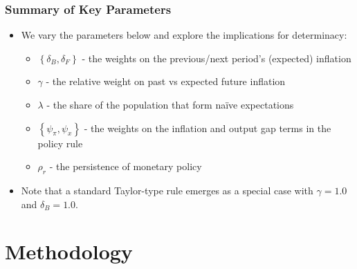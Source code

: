 \documentclass{beamer}
\begin{document}
\begin{frame}
	\frametitle{Summary of Key Parameters}
	\begin{itemize}
		\item We vary the parameters below and explore the implications for determinacy: 
		\begin{itemize}
			\item  $\left\{\delta_B, \delta_F \right\}$ - the weights on the previous/next period's (expected) inflation
			\item $\gamma$ - the relative weight on past vs expected future inflation
			\item $\lambda$ - the share of the population that form na\"ive expectations
			\item  $\left\{\psi_\pi, \psi_x \right\}$ - the weights on the inflation and output gap terms in the policy rule
			\item $\rho_r$ - the persistence of monetary policy
		\end{itemize}
		\item Note that a standard Taylor-type rule emerges as a special case with $\gamma=1.0$ and $\delta_B=1.0$.
	\end{itemize}
\end{frame}

\section*{Methodology}
\end{document}
